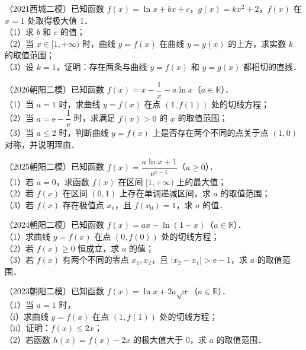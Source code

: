 \begin{example}
（2021西城二模）已知函数 $f(x)=\ln x+bx+c$，$g(x)=kx^2+2$，$f(x)$ 在 $x=1$ 处取得极大值 $1$．\\
（1）求 $b$ 和 $c$ 的值；\\
（2）当 $x\in[1,+\infty)$ 时，曲线 $y=f(x)$ 在曲线 $y=g(x)$ 的上方，求实数 $k$ 的取值范围；\\
（3）设 $k=1$，证明：存在两条与曲线 $y=f(x)$ 和 $y=g(x)$ 都相切的直线．
\end{example}

\begin{example}
（2026朝阳二模）已知函数 $f(x)=x-\dfrac1x-a\ln x$（$a\in\mathbb{R}$）．\\
（1）当 $a=1$ 时，求曲线 $y=f(x)$ 在点 $(1,f(1))$ 处的切线方程；\\
（2）当 $a=\mathrm{e}-\dfrac{1}{\mathrm{e}}$ 时，求满足 $f(x)>0$ 的 $x$ 的取值范围；\\
（3）当 $a\leqslant2$ 时，判断曲线 $y=f(x)$ 上是否存在两个不同的点关于点 $(1,0)$ 对称，并说明理由．
\end{example}

\begin{example}
（2025朝阳二模）已知函数 $f(x)=\dfrac{a\ln x+1}{\mathrm{e}^{x-1}}$（$a\geqslant0$）．\\
（1）若 $a=0$，求函数 $f(x)$ 在区间 $[1,+\infty)$ 上的最大值；\\
（2）若 $f(x)$ 在区间 $(0,1)$ 上存在单调递减区间，求 $a$ 的取值范围；\\
（3）若 $f(x)$ 存在极值点 $x_0$，且 $f(x_0)=1$，求 $a$ 的值．
\end{example}

\begin{example}
（2024朝阳二模）已知函数 $f(x)=ax-\ln(1-x)$（$a\in\mathbb{R}$）．\\
（1）求曲线 $y=f(x)$ 在点 $(0,f(0))$ 处的切线方程；\\
（2）若 $f(x)\geqslant0$ 恒成立，求 $a$ 的值；\\
（3）若 $f(x)$ 有两个不同的零点 $x_1,x_2$，且 $|x_2-x_1|>\mathrm{e}-1$，求 $a$ 的取值范围．
\end{example}

\begin{example}
（2023朝阳二模）已知函数 $f(x)=\ln x+2a\sqrt{x}$（$a\in\mathbb{R}$）．\\
（1）当 $a=1$ 时，\\
（i）求曲线 $y=f(x)$ 在点 $(1,f(1))$ 处的切线方程；\\
（ii）证明：$f(x)\leqslant2x$；\\
（2）若函数 $h(x)=f(x)-2x$ 的极大值大于 $0$，求 $a$ 的取值范围．
\end{example}

